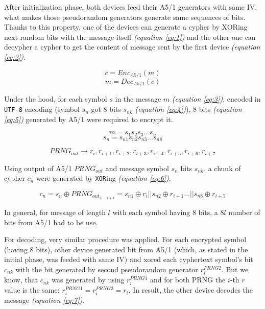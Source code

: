 After initialization phase, both devices feed their A5/1 generators with same IV, what makes those pseudorandom generators generate same sequences of bits. Thanks to this property, one of the devices can generate a cypher by XORing next random bits with the message itself  \textit{(equation \ref{eq:1})} and the other one can decypher a cypher to get the content of message sent by the first device \textit{(equation \ref{eq:2})}.

\begin{equation} \label{eq:1} c = Enc_{A5/1}(m) \end{equation}
\begin{equation} \label{eq:2} m = Dec_{A5/1}(c) \end{equation}

Under the hood, for each symbol $s$ in the message $m$ \textit{(equation \ref{eq:3})}, encoded in \texttt{UTF-8} encoding (symbol $s_n$ got 8 bits $s_{nk}$ \textit{(equation \ref{eq:4})}), 8 bits  \textit{(equation \ref{eq:5})} generated by A5/1 were required to encrypt it.

\begin{equation} \label{eq:3} m = s_1 s_2 s_3 \dots s_n  \end{equation}
\begin{equation} \label{eq:4} s_n = s_{n1} s_{n2} s_{n3} \dots s_{n8}   \end{equation}

\begin{equation} \label{eq:5} PRNG_{out} \rightarrow r_{i}, r_{i+1}, r_{i+2}, r_{i+3}, r_{i+4}, r_{i+5}, r_{i+6}, r_{i+7} \end{equation}

Using output of A5/1 $PRNG_{out}$ and message symbol $s_n$ bits $s_{nk}$, a chunk of cypher $c_n$ were generated by \texttt{XOR}ing \textit{(equation \ref{eq:6})}.

\begin{equation} \label{eq:6} c_n = s_n \oplus PRNG_{out_{i, \dots, i+7}} = s_{n1} \oplus r_{i} || s_{n2} \oplus r_{i+1} \dots || s_{n8} \oplus r_{i+7}\end{equation}

In general, for message of length $l$ with each symbol having $8$ bits, 
a $8l$ number of bits from A5/1 had to be use.

For decoding, very similar procedure was applied. For each encrypted symbol (having 8 bits), other device generated bit from A5/1 (which, as stated in the initial phase, was feeded with same IV) and xored each cyphertext symbol's bit $c_{nk}$ with the bit generated by second pseudorandom generator $r_{i}^{PRNG2}$. But we know, that $c_{nk}$ was generated by using ${r_{i}^{PRNG1}}$ and for both PRNG the $i$-th $r$ value is the same: ${r_{i}^{PRNG1}} = r_{i}^{PRNG2} = r_{i}$. In result, the other device decodes the message \textit{(equation \ref{eq:7})}.

